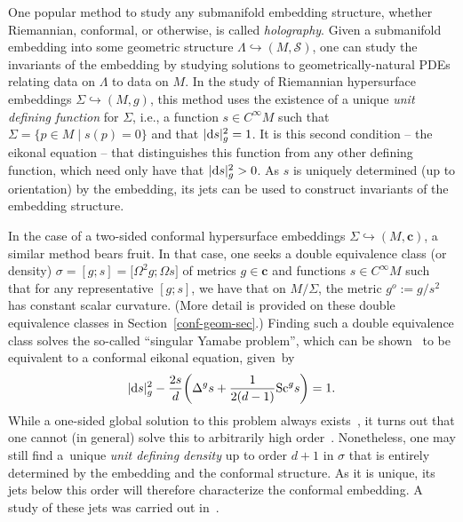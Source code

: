 \documentclass[pdftex]{sigma}
\numberwithin{equation}{section}
\newcommand{\cc}{\boldsymbol{c}}
\renewcommand{\=}{\stackrel \Lambda =}
\begin{document}
One popular method to study any submanifold embedding structure, whether Riemannian, conformal, or otherwise, is called \textit{holography}. Given a submanifold embedding into some geometric structure $\Lambda \hookrightarrow (M,\mathcal{S})$, one can study the invariants of the embedding by studying solutions to geometrically-natural PDEs relating data on $\Lambda$ to data on $M$. In the study of Riemannian hypersurface embeddings $\Sigma \hookrightarrow (M,g)$, this method uses the existence of a unique \textit{unit defining function} for $\Sigma$, i.e., a function $s \in C^\infty M$ such that $\Sigma = \{p \in M \mid s(p) = 0\}$ and that $|{\rm d}s|^2_g = 1$. It is this second condition -- the eikonal equation -- that distinguishes this function from any other defining function, which need only have that $|{\rm d}s|^2_g > 0$. As $s$ is uniquely determined (up to orientation) by the embedding, its jets can be used to construct invariants of the embedding structure.

In the case of a two-sided conformal hypersurface embeddings $\Sigma \hookrightarrow (M,\cc)$, a similar method bears fruit. In that case, one seeks a double equivalence class (or density) $\sigma = [g;s] = \bigl[\Omega^2 g ; \Omega s\bigr]$ of metrics $g \in \cc$ and functions $s \in C^\infty M$ such that for any representative $[g;s]$, we have that on $M/\Sigma$, the metric $g^o := g/s^2$ has constant scalar curvature. (More detail is provided on these double equivalence classes in Section~\ref{conf-geom-sec}.) Finding such a double equivalence class solves the so-called ``singular Yamabe problem'', which can be shown~\cite{Loewner} to be equivalent to a conformal eikonal equation, given~by
\[
|{\rm d}s|^2_g - \frac{2s}{d} \biggl(\Delta^g s + \frac{1}{2(d-1)} \mathrm{Sc}^g s\biggr) = 1 .
\]
While a one-sided global solution to this problem always exists~\cite{ACF,Aviles,Maz}, it turns out that one cannot (in general) solve this to arbitrarily high order~\cite{ACF,Goal}. Nonetheless, one may still find a~unique \textit{unit defining density} up to order $d+1$ in $\sigma$ that is entirely determined by the embedding and the conformal structure. As it is unique, its jets below this order will therefore characterize the conformal embedding. A study of these jets was carried out in~\cite{BGW1}.
\end{document}
